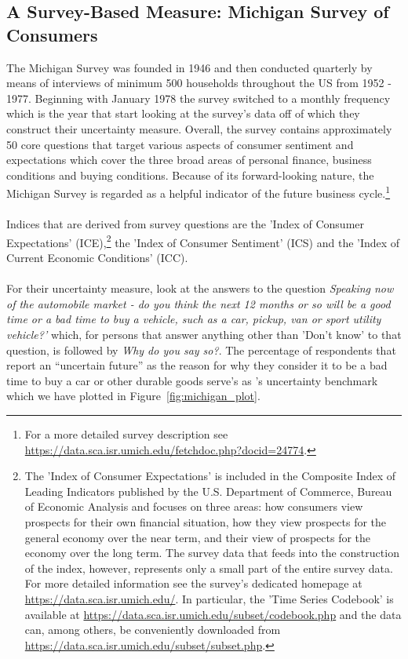\documentclass[a4paper,11pt,listof=nochaptergap,oneside,pointednumbers,bibtotoc,bigheadings,liststotoc]{scrbook}
\begin{document}
\subsection{A Survey-Based Measure: Michigan Survey of Consumers}
\label{sec:michigansurvey}

The Michigan Survey was founded in 1946 and then conducted quarterly by means of interviews of minimum 500 households throughout the US from 1952 - 1977. Beginning with January 1978 the survey switched to a monthly frequency which is the year that \citet{leducandliu:16} start looking at the survey's data off of which they construct their uncertainty measure. Overall, the survey contains approximately 50 core questions that target various aspects of consumer sentiment and expectations which cover the three broad areas of personal finance, business conditions and buying conditions. Because of its forward-looking nature, the Michigan Survey is regarded as a helpful indicator of the future business cycle.\footnote{For a more detailed survey description see \url{https://data.sca.isr.umich.edu/fetchdoc.php?docid=24774}.}\\
\\
Indices that are derived from survey questions are the 'Index of Consumer Expectations' (ICE),\footnote{The 'Index of Consumer Expectations' is included in the Composite Index of Leading Indicators published by the U.S. Department of Commerce, Bureau of Economic Analysis and focuses on three areas: how consumers view prospects for their own financial situation, how they view prospects for the general economy over the near term, and their view of prospects for the economy over the long term. The survey data that feeds into the construction of the index, however, represents only a small part of the entire survey data. For more detailed information see the survey's dedicated homepage at \url{https://data.sca.isr.umich.edu/}. In particular, the 'Time Series Codebook' is available at \url{https://data.sca.isr.umich.edu/subset/codebook.php} and the data can, among others, be conveniently downloaded from \url{https://data.sca.isr.umich.edu/subset/subset.php}.} the 'Index of Consumer Sentiment' (ICS) and the 'Index of Current Economic Conditions' (ICC).\\
\\
For their uncertainty measure, \citet{leducandliu:16} look at the answers to the question \textit{Speaking now of the automobile market - do you think the next 12 months or so will be a good time or a bad time to buy a vehicle, such as a car, pickup, van or sport utility vehicle?'} which, for persons that answer anything other than 'Don't know' to that question, is followed by \textit{Why do you say so?}. The percentage of respondents that report an ``uncertain future'' as the reason for why they consider it to be a bad time to buy a car or other durable goods serve's as \citet{leducandliu:16}'s uncertainty benchmark which we have plotted in Figure~\ref{fig:michigan_plot}.
\end{document}
